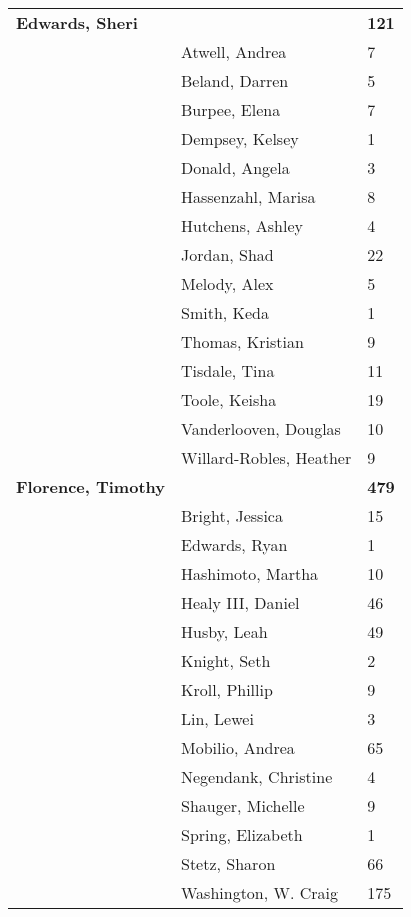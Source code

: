 \documentclass{article}\usepackage[]{graphicx}\usepackage[]{color}
\begin{document}
{\begin{longtable} { >{\raggedright}p{}|p{}p{}}
   \rowcolor[gray]{0.90}\textbf{Edwards, Sheri} &  & \hspace{2cm}\textbf{121} \\ 
   \rowcolor[gray]{0.90} & Atwell, Andrea & 7 \\ 
   & Beland, Darren & 5 \\ 
   & Burpee, Elena & 7 \\ 
   & Dempsey, Kelsey & 1 \\ 
   \rowcolor[gray]{0.90} & Donald, Angela & 3 \\ 
   \rowcolor[gray]{0.90} & Hassenzahl, Marisa & 8 \\ 
   \rowcolor[gray]{0.90} & Hutchens, Ashley & 4 \\ 
   & Jordan, Shad & 22 \\ 
   & Melody, Alex & 5 \\ 
   & Smith, Keda & 1 \\ 
   \rowcolor[gray]{0.90} & Thomas, Kristian & 9 \\ 
   \rowcolor[gray]{0.90} & Tisdale, Tina & 11 \\ 
   \rowcolor[gray]{0.90} & Toole, Keisha & 19 \\ 
   & Vanderlooven, Douglas & 10 \\ 
   & Willard-Robles, Heather & 9 \\ 
  \textbf{Florence, Timothy} &  & \hspace{2cm}\textbf{479} \\ 
   \rowcolor[gray]{0.90} & Bright, Jessica & 15 \\ 
   \rowcolor[gray]{0.90} & Edwards, Ryan & 1 \\ 
   \rowcolor[gray]{0.90} & Hashimoto, Martha & 10 \\ 
   & Healy III, Daniel & 46 \\ 
   & Husby, Leah & 49 \\ 
   & Knight, Seth & 2 \\ 
   \rowcolor[gray]{0.90} & Kroll, Phillip & 9 \\ 
   \rowcolor[gray]{0.90} & Lin, Lewei & 3 \\ 
   \rowcolor[gray]{0.90} & Mobilio, Andrea & 65 \\ 
   & Negendank, Christine & 4 \\ 
   & Shauger, Michelle & 9 \\ 
   & Spring, Elizabeth & 1 \\ 
   \rowcolor[gray]{0.90} & Stetz, Sharon & 66 \\ 
   \rowcolor[gray]{0.90} & Washington, W. Craig & 175 \\ 

\end{longtable}}
\end{document}
